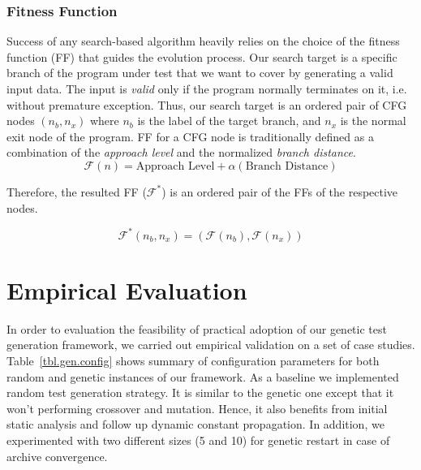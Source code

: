 \documentclass[sigconf]{acmart}
\begin{document}
\subsubsection{Fitness Function}
\label{sub.sub.sec.fitness.fun}

Success of any search-based algorithm heavily relies on the choice of the fitness function (FF) that guides the evolution process. Our search target is a specific branch of the program under test that we want to cover by generating a valid input data. The input is \emph{valid} only if the program normally terminates on it, i.e. without premature exception. Thus, our search target is an ordered pair of CFG nodes $(n_b, n_x)$ where $n_b$ is the label of the target branch, and $n_x$ is the normal exit node of the program. FF for a CFG node is traditionally defined as a combination of the \emph{approach level} and the normalized \emph{branch distance}\cite{arcuri2010does}. 
\[
\mathcal{F}(n) = \text{Approach Level} + \alpha({\text{Branch Distance}})
\]

Therefore, the resulted FF ($\mathcal{F}^*$) is an ordered pair of the FFs of the respective nodes.   

\[
\mathcal{F}^*(n_b, n_x) = (\mathcal{F}(n_b), \mathcal{F}(n_x))
\]

\section{Empirical Evaluation}
\label{sec.evaluation}

In order to evaluation the feasibility of practical adoption of our genetic test generation framework, we carried out empirical validation on a set of case studies. Table~\ref{tbl.gen.config} shows summary of configuration parameters for both random and genetic instances of our framework.  As a baseline we implemented random test generation strategy. It is similar to the genetic one except that it won't performing crossover and mutation. Hence, it also benefits from initial static analysis and follow up dynamic constant propagation. In addition, we experimented with two different sizes (5 and 10) for genetic restart in case of archive convergence.
\end{document}
